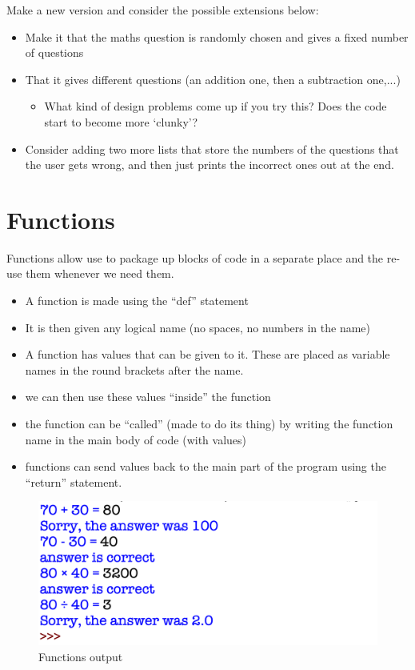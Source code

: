 \documentclass[a4paper,12pt]{article}
\begin{document}
Make a new version and consider the possible extensions below:
\begin{itemize}
	\item Make it that the maths question is randomly chosen and gives a fixed number of questions
	\item That it gives different questions (an addition one, then a subtraction one,...)
	\begin{itemize}
		\item What kind of design problems come up if you try this? Does the code start to become more `clunky'?
	\end{itemize}
	\item Consider adding two more lists that store the numbers of the questions that the user gets wrong, and then just prints the incorrect ones out at the end.
\end{itemize}







\newpage
\section{Functions}
Functions allow use to package up blocks of code in a separate place and the re-use them whenever we need them.\\
\begin{itemize}
	\item A function is made using the ``def'' statement
	\item It is then given any logical name (no spaces, no numbers in the name)
	\item A function has values that can be given to it. These are placed as variable names in the round brackets after the name.
	\item we can then use these values ``inside'' the function
	\item the function can be ``called'' (made to do its thing) by writing the function name in the main body of code (with values)
	\item functions can send values back to the main part of the program using the ``return'' statement.
\end{itemize}

\begin{figure} [!h]
	\centering
	\includegraphics[width=15cm]{screen_shots/maths_functions_cap.png}
	\caption*{Functions output}
\end{figure}
\newpage
\end{document}
